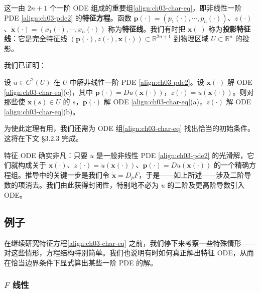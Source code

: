 \documentclass[../../main.tex]{subfiles}
\begin{document}
这一由 $2n+1$ 个一阶 ODE 组成的重要组\eqref{align:ch03-char-eq}，即非线性一阶 PDE \eqref{align:ch03-pde2} 的\textbf{特征方程}。函数 $\mathbf{p}(\cdot)=(p_1(\cdot),\cdots,p_n(\cdot))$、$z(\cdot)$、$\mathbf{x}(\cdot)=(x_1(\cdot),\cdots,x_n(\cdot))$ 称为\textbf{特征线}。我们有时把 $\mathbf{x}(\cdot)$ 称为\textbf{投影特征线}：它是完全特征线 $(\mathbf{p}(\cdot),z(\cdot),\mathbf{x}(\cdot))\subset\mathbb{R}^{2n+1}$ 到物理区域 $U\subset\mathbb{R}^n$ 的投影。

我们已证明：

\begin{theorem}\label{theorem:ch03-char-ode}设 $u\in C^2(U)$ 在 $U$ 中解非线性一阶 PDE \eqref{align:ch03-pde2}。设 $\mathbf{x}(\cdot)$ 解 ODE \eqref{align:ch03-char-eq}(c)，其中 $\mathbf{p}(\cdot)=Du(\mathbf{x}(\cdot))$，$z(\cdot)=u(\mathbf{x}(\cdot))$。则对那些使 $\mathbf{x}(s)\in U$ 的 $s$，$\mathbf{p}(\cdot)$ 解 ODE \eqref{align:ch03-char-eq}(a)，$z(\cdot)$ 解 ODE \eqref{align:ch03-char-eq}(b)。
\end{theorem}

为使此定理有用，我们还需为 ODE 组\eqref{align:ch03-char-eq} 找出恰当的初始条件。这将在下文 \S3.2.3 完成。

\begin{remark}\label{remark:ch03-char-ode}
特征 ODE 确实非凡：只要 $u$ 是一般非线性 PDE \eqref{align:ch03-pde2} 的光滑解，它们就构成关于 $\mathbf{x}(\cdot)$、$z(\cdot)=u(\mathbf{x}(\cdot))$、$\mathbf{p}(\cdot)=Du(\mathbf{x}(\cdot))$ 的一个精确方程组。推导中的关键一步是我们令 $\dot{\mathbf{x}}=D_p F$，于是——如上所述——涉及二阶导数的项消去。我们由此获得封闭性，特别地不必为 $u$ 的二阶及更高阶导数引入 ODE。
\end{remark}

\subsection{例子}\label{subsection:ch03-char-examples}

在继续研究特征方程\eqref{align:ch03-char-eq} 之前，我们停下来考察一些特殊情形——对这些情形，方程结构特别简单。我们也说明有时如何真正解出特征 ODE，从而在恰当边界条件下显式算出某些一阶 PDE 的解。

\subsubsection{$F$ 线性}
\end{document}
